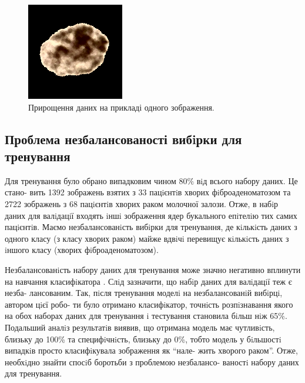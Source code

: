 \begin{figure}[t!]
	\endminipage\hfill
	\centering	
	\includegraphics[width=0.97\linewidth]{Figures/Chapter4/aug_4.png}
	\endminipage\hfill	
	
	\caption{Прирощення даних на прикладі одного зображення.}
	\label{fig:data_augmentation}
\end{figure}


\subsection{Проблема незбалансованості вибiрки для тренування}

Для тренування було обрано випадковим чином \(80\%\) вiд всього набору даних. Це стано- вить 1392 зображень взятих з 33 пацiєнтiв хворих фiброаденоматозом та 2722 зображень з 68 пацiєнтiв хворих раком молочної залози. Отже, в набiр даних для валiдацiї входять iншi зображення ядер букального епiтелiю тих самих пацiєнтiв. Маємо незбалансованiсть вибiрки для тренування, де кiлькiсть даних з одного класу (з класу хворих раком) майже вдвiчi перевищує кiлькiсть даних з iншого класу (хворих фiброаденоматозом). 

Незбалансованiсть набору даних для тренування може значно негативно вплинути на навчання класифiкатора \citep{nn:imbalance2}. Слiд зазначити, що набiр даних для валiдацiї теж є незба- лансованим. Так, пiсля тренування моделi на незбалансованiй вибiрцi, автором цiєї робо- ти було отримано класифiкатор, точнiсть розпiзнавання якого на обох наборах даних для тренування i тестування становила бiльш нiж 65\%. Подальший аналiз результатiв виявив, що отримана модель має чутливiсть, близьку до 100\% та специфiчнiсть, близьку до 0\%, тобто модель у бiльшостi випадкiв просто класифiкувала зображення як \enquote{нале- жить хворого раком}. Отже, необхiдно знайти спосiб боротьби з проблемою незбалансо- ваностi набору даних для тренування.

